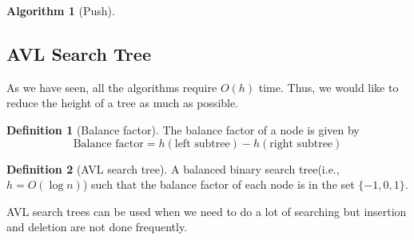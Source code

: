 \documentclass[10pt, a4paper]{extarticle}
\theoremstyle{definition}
\newtheorem{alg}{Algorithm}
\newtheorem{defn}{Definition}
\begin{document}
\begin{alg}[Push]
	\subsection{AVL Search Tree}
	As we have seen, all the algorithms require $O(h)$ time. Thus, we would like to reduce the height of a tree as much as possible.
	\begin{defn}[Balance factor]
		The balance factor of a node is given by
		\[\text{Balance factor}=h(\text{left subtree})-h(\text{right subtree})\]
	\end{defn}
	\begin{defn}[AVL search tree]
		A balanced binary search tree(i.e., $h=O(\log n)$) such that the balance factor of each node is in the set $\{-1,0,1\}$.
	\end{defn}

	AVL search trees can be used when we need to do a lot of searching but insertion and deletion are not done frequently.


\end{alg}
\end{document}
